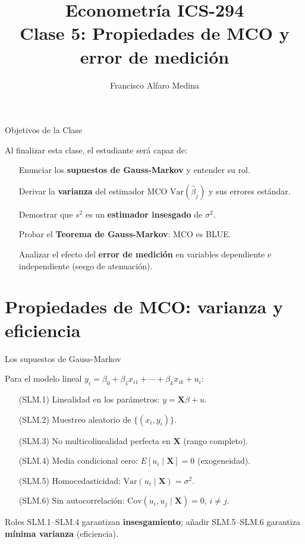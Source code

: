 \documentclass[10pt]{beamer}
\title[ICS-294]{Econometría ICS-294\\ \small{Clase 5: Propiedades de MCO y error de medición}}
\author{Francisco Alfaro Medina}
\institute[USM]
{Universidad Técnica Federico Santa María\\ %
	\medskip
	\textit{francisco.alfaro@usm.cl} %

}
\date{}
\begin{document}
\begin{frame}
	\titlepage %
\end{frame}

\begin{frame}{Objetivos de la Clase}

Al finalizar esta clase, el estudiante será capaz de:

\begin{itemize}
    \item[\checkmark] Enunciar los \textbf{supuestos de Gauss-Markov} y entender su rol.
    \item[\checkmark] Derivar la \textbf{varianza} del estimador MCO $\text{Var}(\hat\beta_j)$ y sus errores estándar.
    \item[\checkmark] Demostrar que $s^2$ es un \textbf{estimador insesgado} de $\sigma^2$.
    \item[\checkmark] Probar el \textbf{Teorema de Gauss-Markov}: MCO es BLUE.
    \item[\checkmark] Analizar el efecto del \textbf{error de medición} en variables dependiente e independiente (sesgo de atenuación).
\end{itemize}

\end{frame}


\section{Propiedades de MCO: varianza y eficiencia}

\begin{frame}{Los supuestos de Gauss-Markov}

Para el modelo lineal $y_i=\beta_0+\beta_1 x_{i1}+\cdots+\beta_k x_{ik}+u_i$:

\begin{enumerate}
    \item[(SLM.1)] Linealidad en los parámetros: $y=\mathbf{X}\beta+u$.
    \pause
    \item[(SLM.2)] Muestreo aleatorio de $\{(x_i,y_i)\}$.
    \pause
    \item[(SLM.3)] No multicolinealidad perfecta en $\mathbf{X}$ (rango completo).
    \pause
    \item[(SLM.4)] Media condicional cero: $E[u_i \mid \mathbf{X}]=0$ (exogeneidad).
    \pause
    \item[(SLM.5)] Homocedasticidad: $\text{Var}(u_i \mid \mathbf{X})=\sigma^2$.
    \pause
    \item[(SLM.6)] Sin autocorrelación: $\text{Cov}(u_i,u_j\mid \mathbf{X})=0$, $i\neq j$.
\end{enumerate}

\vspace{0.3cm}
\begin{block}{Roles}
SLM.1--SLM.4 garantizan \textbf{insesgamiento}; añadir SLM.5--SLM.6 garantiza \textbf{mínima varianza} (eficiencia).
\end{block}

\end{frame}
\end{document}
